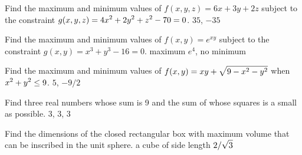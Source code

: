 \exercise Find the maximum and minimum values of $f(x,y,z)=6x+3y+2z$ subject
to the constraint $\displaystyle g(x,y,z) = 4x^2+2y^2 + z^2 - 70 = 0$.
\answer $35$, $-35$
\endanswer
\endexercise

\exercise Find the maximum and minimum values of $f(x,y)=e^{xy}$ subject
to the constraint $g(x,y) = x^3+y^3 - 16 = 0$.  
\answer maximum $e^4$, no minimum
\endanswer
\endexercise

\exercise Find the maximum and minimum values of $\displaystyle f(x,y) = xy +
\sqrt{9-x^2-y^2}$ when $\displaystyle x^2+y^2 \leq 9$.
\answer $5$, $-9/2$
\endanswer
\endexercise

\exercise Find three real numbers whose sum is 9 and the sum of whose squares
is a small as possible.  
\answer $3$, $3$, $3$
\endanswer
\endexercise

\exercise Find the dimensions of the closed rectangular box with maximum volume
that can be inscribed in the unit sphere.
\answer a cube of side length $\displaystyle 2/\sqrt{3}$
\endanswer

% 
% 

\endexercise

\endexercises
